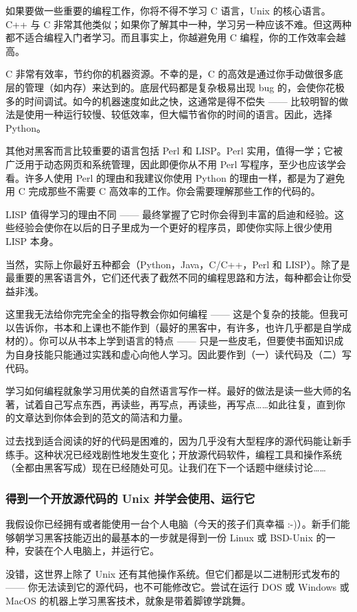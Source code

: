 如果要做一些重要的编程工作，你将不得不学习 C 语言，Unix 的核心语言。C++ 与 C 非常其他类似；如果你了解其中一种，学习另一种应该不难。但这两种都不适合编程入门者学习。而且事实上，你越避免用 C 编程，你的工作效率会越高。

C 非常有效率，节约你的机器资源。不幸的是，C 的高效是通过你手动做很多底层的管理（如内存）来达到的。底层代码都是复杂极易出现 bug 的，会使你花极多的时间调试。如今的机器速度如此之快，这通常是得不偿失 —— 比较明智的做法是使用一种运行较慢、较低效率，但大幅节省你的时间的语言。因此，选择 Python。

其他对黑客而言比较重要的语言包括 Perl 和 LISP。Perl 实用，值得一学；它被广泛用于动态网页和系统管理，因此即便你从不用 Perl 写程序，至少也应该学会看。许多人使用 Perl 的理由和我建议你使用 Python 的理由一样，都是为了避免用 C 完成那些不需要 C 高效率的工作。你会需要理解那些工作的代码的。

LISP 值得学习的理由不同 —— 最终掌握了它时你会得到丰富的启迪和经验。这些经验会使你在以后的日子里成为一个更好的程序员，即使你实际上很少使用 LISP 本身。

当然，实际上你最好五种都会（Python，Java，C/C++，Perl 和 LISP）。除了是最重要的黑客语言外，它们还代表了截然不同的编程思路和方法，每种都会让你受益非浅。

这里我无法给你完完全全的指导教会你如何编程 —— 这是个复杂的技能。但我可以告诉你，书本和上课也不能作到（最好的黑客中，有许多，也许几乎都是自学成材的）。你可以从书本上学到语言的特点 —— 只是一些皮毛，但要使书面知识成为自身技能只能通过实践和虚心向他人学习。因此要作到（一）读代码及（二）写代码。

学习如何编程就象学习用优美的自然语言写作一样。最好的做法是读一些大师的名著，试着自己写点东西，再读些，再写点，再读些，再写点……如此往复，直到你的文章达到你体会到的范文的简洁和力量。

过去找到适合阅读的好的代码是困难的，因为几乎没有大型程序的源代码能让新手练手。这种状况已经戏剧性地发生变化；开放源代码软件，编程工具和操作系统（全都由黑客写成）现在已经随处可见。让我们在下一个话题中继续讨论……



\subsubsection{得到一个开放源代码的 Unix 并学会使用、运行它}
我假设你已经拥有或者能使用一台个人电脑（今天的孩子们真幸福 :-)）。新手们能够朝学习黑客技能迈出的最基本的一步就是得到一份 Linux 或 BSD-Unix 的一种，安装在个人电脑上，并运行它。

没错，这世界上除了 Unix 还有其他操作系统。但它们都是以二进制形式发布的 —— 你无法读到它的源代码，也不可能修改它。尝试在运行 DOS 或 Windows 或 MacOS 的机器上学习黑客技术，就象是带着脚镣学跳舞。

